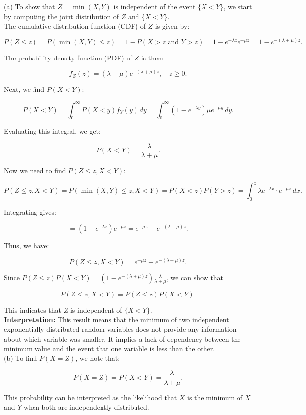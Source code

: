 \begin{solution}
(a) To show that \( Z = \min(X, Y) \) is independent of the event \( \{X < Y\} \), we start by computing the joint distribution of \( Z \) and \( \{X < Y\} \).\\

The cumulative distribution function (CDF) of \( Z \) is given by:

\[
P(Z \leq z) = P(\min(X, Y) \leq z) = 1 - P(X > z \text{ and } Y > z) = 1 - e^{-\lambda z} e^{-\mu z} = 1 - e^{-(\lambda + \mu) z}.
\]

The probability density function (PDF) of \( Z \) is then:

\[
f_Z(z) = (\lambda + \mu) e^{-(\lambda + \mu) z}, \quad z \geq 0.
\]

Next, we find \( P(X < Y) \):

\[
P(X < Y) = \int_0^{\infty} P(X < y) f_Y(y) \, dy = \int_0^{\infty} (1 - e^{-\lambda y}) \mu e^{-\mu y} \, dy.
\]

Evaluating this integral, we get:

\[
P(X < Y) = \frac{\lambda}{\lambda + \mu}.
\]

Now we need to find \( P(Z \leq z, X < Y) \):

\[
P(Z \leq z, X < Y) = P(\min(X, Y) \leq z, X < Y) = P(X < z) P(Y > z) = \int_0^z \lambda e^{-\lambda x} \cdot e^{-\mu z} \, dx.
\]

Integrating gives:

\[
= (1 - e^{-\lambda z}) e^{-\mu z} = e^{-\mu z} - e^{-(\lambda + \mu) z}.
\]

Thus, we have:

\[
P(Z \leq z, X < Y) = e^{-\mu z} - e^{-(\lambda + \mu) z}.
\]

Since \( P(Z \leq z) P(X < Y) = \left( 1 - e^{-(\lambda + \mu) z} \right) \frac{\lambda}{\lambda + \mu} \), we can show that

\[
P(Z \leq z, X < Y) = P(Z \leq z) P(X < Y).
\]

This indicates that \( Z \) is independent of \( \{X < Y\} \).\\

\textbf{Interpretation:} This result means that the minimum of two independent exponentially distributed random variables does not provide any information about which variable was smaller. It implies a lack of dependency between the minimum value and the event that one variable is less than the other.\\

(b) To find \( P(X = Z) \), we note that:

\[
P(X = Z) = P(X < Y) = \frac{\lambda}{\lambda + \mu}.
\]

This probability can be interpreted as the likelihood that \( X \) is the minimum of \( X \) and \( Y \) when both are independently distributed.
\end{solution}

